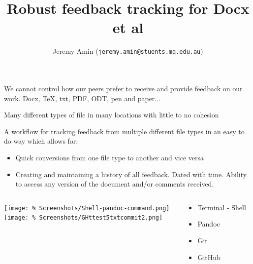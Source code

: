 \documentclass[unknownkeysallowed,usepdftitle=false, aspectratio=169, parskip=full]{beamer}
\title{Robust feedback tracking for Docx et al}
\author{Jeremy Amin\inst{1} (\texttt{jeremy.amin@stuents.mq.edu.au})}
\newcommand{\secvariable}{nothing}
\newcommand{\mysection}[1]{\renewcommand{\secvariable}{#1}
}
\begin{document}
\mysection{abstract}
\begin{frame}\label{\secvariable}



\parbox{\linewidth}{

 We cannot control how our peers prefer to receive and provide feedback on our work. Docx, TeX, txt, PDF, ODT, pen and paper...


\vspace{12pt}

 Many different types of file in many locations with little to no cohesion

 \vspace{12pt}
 
 A workflow for tracking feedback from multiple different file types in an easy to do way which allows for:
\begin{itemize}
    \item Quick conversions from one file type to another and vice versa
    \item Creating and maintaining a history of all feedback. Dated with time. Ability to access any version of the document and/or comments received.

\end{itemize}

 \vspace{12pt}
 
\boldsymbol{}
}


   
\end{frame}

\begin{frame}\label{\secvariable}
  \begin{columns}[t]
  \begin{column}[c]{0.45\textwidth}
\texttt{[image: \%
Screenshots/Shell-pandoc-command.png]}\\
\vspace{12pt}
\texttt{[image: \%
Screenshots/GHttest5txtcommit2.png]}
    \end{column}
    \begin{column}[c]{0.45\textwidth}
    \parbox{\linewidth}{
    \begin{itemize}
        \item Terminal - Shell
        \item Pandoc
        \item Git
        \item GitHub 
    \end{itemize}
      
      
      \vspace{12pt}
      }
    \end{column}
    
  \end{columns}

  
\end{frame}
\end{document}
